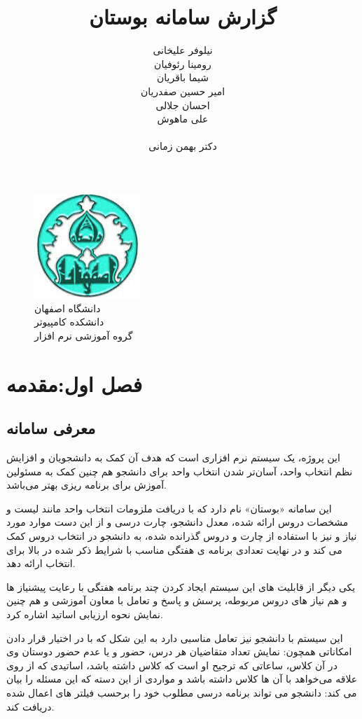 \documentclass[oneside]{book}
\title{گزارش سامانه بوستان}
\author{نیلوفر علیخانی\\رومینا رئوفیان\\شیما باقریان\\امیر حسین صفدریان\\احسان جلالی\\علی ماهوش\\ 
	\\دکتر بهمن زمانی}
\begin{document}
	
\begin{figure}[h!]	
\begin{center}
\includegraphics[height = 4cm,width= 4cm]{University of Isfahan.jpg}
\\
دانشگاه اصفهان\\
دانشکده کامپیوتر\\
گروه آموزشی نرم افزار\\
\end{center}
\maketitle
\end{figure}


\newpage
\doublespacing
\tableofcontents
\newpage
\chapter{فصل اول:مقدمه}
\newpage
\section{معرفی سامانه}

\large
این پروژه، یک سیستم نرم افزاری است که هدف آن کمک به دانشجویان و افزایش نظم  انتخاب واحد، آسان‌تر شدن انتخاب واحد برای دانشجو هم چنین کمک به مسئولین آموزش برای برنامه ریزی بهتر می‌باشد.  

 این سامانه «بوستان» نام دارد که با دریافت ملزومات انتخاب واحد مانند لیست و مشخصات دروس ارائه شده، معدل دانشجو، چارت درسی و از این دست موارد مورد نیاز و نیز با استفاده از چارت و دروس گذرانده شده، به دانشجو در انتخاب دروس کمک می کند و در نهایت تعدادی برنامه ی هفتگی مناسب با شرایط ذکر شده در بالا برای انتخاب ارائه دهد.
 
 یکی دیگر از قابلیت های این سیستم  ایجاد کردن چند برنامه هفتگی با رعایت پیشنیاز ها و هم نیاز های دروس مربوطه، پرسش و پاسخ و تعامل با معاون آموزشی و هم چنین نمایش نحوه ارزیابی اساتید اشاره کرد.
 
 این سیستم با دانشجو نیز تعامل مناسبی دارد به این شکل که با در اختیار قرار دادن امکاناتی همچون: نمایش تعداد متقاضیان هر درس، حضور و یا عدم حضور دوستان وی در آن کلاس، ساعاتی که ترجیح او است که کلاس داشته باشد، اساتیدی که از روی علاقه می‌خواهد با آن ها کلاس داشته باشد و مواردی از این دسته که این مسئله را بیان می کند: دانشجو می تواند برنامه درسی مطلوب خود را برحسب فیلتر های اعمال شده دریافت کند.
 
\end{document}
